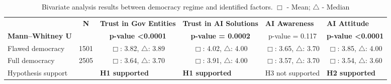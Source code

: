 \documentclass[
]{ceurart}
\begin{document}
   \begin{table}
    \begin{center}
    {\caption{Bivariate analysis results between democracy regime and identified factors. $\Box$ - Mean; $\bigtriangleup$ - Median}\label{fullData}}
    \begin{tabular}{llllll}
    \cline{1-6}
    \multicolumn{1}{c}{} & \multicolumn{1}{c}{\textbf{N}} & \multicolumn{1}{p{2.5cm}}{\textbf{Trust in Gov Entities}}         & \multicolumn{1}{p{2.5cm}}{\textbf{Trust in AI Solutions}} & \multicolumn{1}{p{2.5cm}}{\textbf{AI Awareness}} & \multicolumn{1}{p{2.5cm}}{\textbf{AI Attitude}}                  \\ \cline{1-6}
    
    \textbf{Mann–Whitney U}                              &                                & \multicolumn{1}{c}{\textbf{p-value \textless 0.0001}}             & \multicolumn{1}{c}{\textbf{p-value = 0.0002}}  & \multicolumn{1}{c}{p-value = 0.117}  & \multicolumn{1}{c}{\textbf{p-value \textless 0.0001}}            \\
    \cline{1-6}
    Flawed democracy                              & \multicolumn{1}{c}{1501}       & \multicolumn{1}{c}{$\Box$: 3.82, $\bigtriangleup$: 3.89}                        & \multicolumn{1}{c}{$\Box$: 4.02, $\bigtriangleup$: 4.00}    & \multicolumn{1}{c}{$\Box$: 3.65, $\bigtriangleup$: 3.70}  & \multicolumn{1}{c}{$\Box$: 3.85, $\bigtriangleup$: 4.00}                      \\
    Full democracy                                         & \multicolumn{1}{c}{2505}       & \multicolumn{1}{c}{$\Box$: 3.64, $\bigtriangleup$: 3.70}                        & \multicolumn{1}{c}{$\Box$: 3.91, $\bigtriangleup$: 4.00}      
    & \multicolumn{1}{c}{$\Box$: 3.57, $\bigtriangleup$: 3.70}
    & \multicolumn{1}{c}{$\Box$: 3.54, $\bigtriangleup$: 3.60}
    \\
    \cline{1-6}
       \multicolumn{2}{l}{Hypothesis support}    &  \textbf{H1 supported} & \textbf{H1 supported} & H3 not supported & \textbf{H2 supported}

    
    \end{tabular}
    \end{center}
    \vspace{-0.5cm}
    \end{table}
\end{document}
